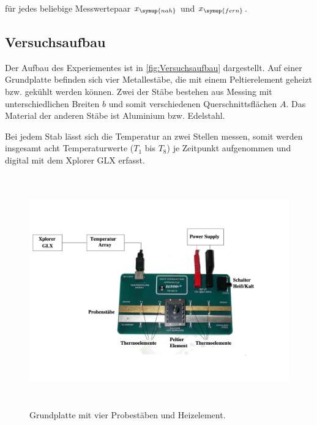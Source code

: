 für jedes beliebige Messwertepaar $x_{\symup{nah}}$ und $x_{\symup{fern}}$. \cite{v204}

\subsection{Versuchsaufbau}
\label{sec:Versuchsaufbau}

Der Aufbau des Experiementes ist in \autoref{fig:Versuchsaufbau} dargestellt.
Auf einer Grundplatte befinden sich vier Metallestäbe, die mit einem Peltierelement geheizt bzw. gekühlt werden können.
Zwei der Stäbe bestehen aus Messing mit unterschiedlichen Breiten $b$ und somit verschiedenen Querschnittsflächen $A$. Das Material der anderen Stäbe ist
Aluminium bzw. Edelstahl.

Bei jedem Stab lässt sich die Temperatur an zwei Stellen messen, somit werden insgesamt acht Temperaturwerte ($T_{1}$ bis $T_{8}$) je
Zeitpunkt aufgenommen und digital mit dem \glqq Xplorer GLX\grqq{} erfasst.

\begin{figure} [H]
    \centering
    \includegraphics[height=10cm]{content/Abbildungen/Versuchsaufbau.pdf}
    \caption{Grundplatte mit vier Probestäben und Heizelement.\cite{v204}}
    \label{fig:Versuchsaufbau}
\end{figure}